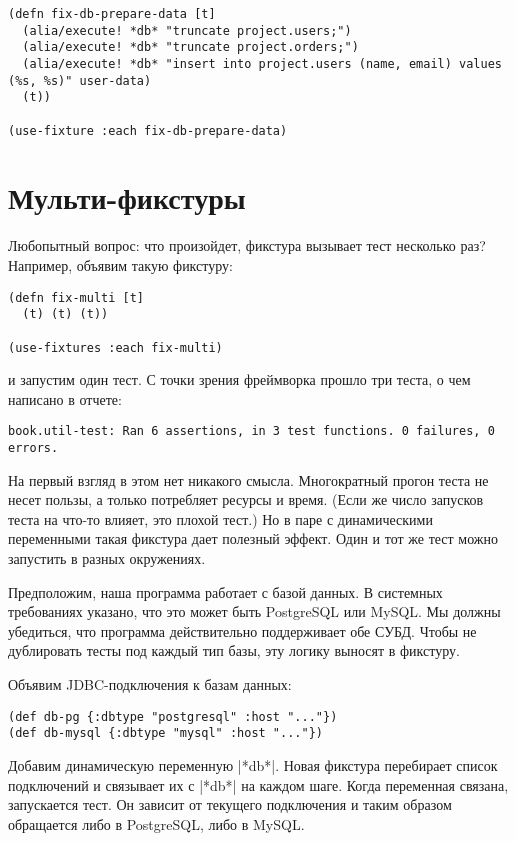 \begin{verbatim}
(defn fix-db-prepare-data [t]
  (alia/execute! *db* "truncate project.users;")
  (alia/execute! *db* "truncate project.orders;")
  (alia/execute! *db* "insert into project.users (name, email) values (%s, %s)" user-data)
  (t))

(use-fixture :each fix-db-prepare-data)
\end{verbatim}

\section{Мульти-фикстуры}

Любопытный вопрос: что произойдет, фикстура вызывает тест несколько раз?
Например, объявим такую фикстуру:

\begin{verbatim}
(defn fix-multi [t]
  (t) (t) (t))

(use-fixtures :each fix-multi)
\end{verbatim}

и запустим один тест. С точки зрения фреймворка прошло три теста, о чем написано
в отчете:

\begin{verbatim}
book.util-test: Ran 6 assertions, in 3 test functions. 0 failures, 0 errors.
\end{verbatim}

На первый взгляд в этом нет никакого смысла. Многократный прогон теста не несет
пользы, а только потребляет ресурсы и время. (Если же число запусков теста на
что-то влияет, это плохой тест.) Но в паре с динамическими переменными такая
фикстура дает полезный эффект. Один и тот же тест можно запустить в разных
окружениях.

Предположим, наша программа работает с базой данных. В системных требованиях
указано, что это может быть PostgreSQL или MySQL. Мы должны убедиться, что
программа действительно поддерживает обе СУБД. Чтобы не дублировать тесты под
каждый тип базы, эту логику выносят в фикстуру.

Объявим JDBC-подключения к базам данных:

\begin{verbatim}
(def db-pg {:dbtype "postgresql" :host "..."})
(def db-mysql {:dbtype "mysql" :host "..."})
\end{verbatim}

Добавим динамическую переменную \spverb|*db*|. Новая фикстура перебирает список
подключений и связывает их с \spverb|*db*| на каждом шаге. Когда переменная связана,
запускается тест. Он зависит от текущего подключения и таким образом обращается
либо в PostgreSQL, либо в MySQL.

